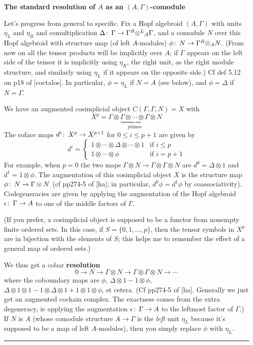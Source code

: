 \documentclass[12pt]{article}
\theoremstyle{definition}
\theoremstyle{remark}
\def\co{\colon\thinspace}
\newcommand{\rt}{{{}^R \otimes}}
\newcommand{\dt}{{{}^R \otimes^L}}
\begin{document}
\textbf{The standard resolution of $A$ as an $(A,\Gamma)$-comodule}

Let's progress from general to specific.  Fix a Hopf algebroid
$(A,\Gamma)$ with units $\eta_L$ and $\eta_R$ and comultiplication
$\Delta\co \Gamma \to \Gamma \dt_A \Gamma$, and a comodule $N$ over this
Hopf algebroid with structure map (of left $A$-modules) $\phi\co N \to \Gamma \rt_A N$.
(From now on all the tensor products will be implicitly over $A$; if
$\Gamma$ appears on the left side of the tensor it is implicitly using
$\eta_R$, the right unit, as the right module structure, and similarly
using $\eta_L$ if it appears on the opposite side.) Cf def 5.12 on p18 of [coctalos]. In particular, $\phi = \eta_L$ if $N = A$ (see below), and $\phi = \Delta$ if $N = \Gamma$.

We have an augmented cosimplicial object $C(\Gamma,\Gamma,N) = X$ with
\[
X^p = \Gamma \otimes \underbrace{\Gamma \otimes \cdots \otimes \Gamma}_{p\text{
    times}} \otimes N
\]
The coface maps $d^i\co X^p \to X^{p+1}$ for $0 \leq i \leq p+1$ are
given by
\[
d^i = \begin{cases}
1 \otimes \cdots \otimes \Delta \otimes \cdots
\otimes 1 &\text{if }i \leq p\\
1 \otimes \cdots \otimes \phi &\text{if }i = p+1
\end{cases}
\]
For example, when $p=0$ the two maps $\Gamma \otimes N \to \Gamma
\otimes \Gamma \otimes N$ are $d^0 = \Delta \otimes 1$ and $d^1 = 1
\otimes \phi$.  The augmentation of this cosimplicial object $X$ is the
structure map $\phi\co N \to \Gamma \otimes N$ (cf pp274-5 of [ha]; in particular, $d^0\phi = d^1\phi$ by coassociativity).  Codegeneracies are given by applying the augmentation of the Hopf algebroid $\epsilon\co \Gamma \to A$ to one of the middle factors of $\Gamma$.

(If you prefer, a cosimplicial object is supposed to be a functor from
nonempty finite ordered sets.  In this case, if $S = \{0,1,\ldots,p\}$,
then the tensor symbols in $X^p$ are in bijection with the elements of
$S$; this helps me to remember the effect of a general map of ordered
sets.)

We thus get a cobar \textbf{resolution}
\[
0 \to N \to \Gamma \otimes N \to \Gamma \otimes \Gamma \otimes N \to
\cdots
\]
where the coboundary maps are $\phi$, $\Delta \otimes 1 - 1 \otimes
\phi$, $\Delta \otimes 1 \otimes 1 - 1 \otimes \Delta \otimes 1 + 1
\otimes 1 \otimes \phi$, et cetera. (Cf pp274-5 of [ha]. Generally we just get an augmented cochain complex. The exactness comes from the extra degeneracy, ie applying the augmentation $\epsilon\co \Gamma \to A$ to the leftmost factor of $\Gamma$.) If $N$ is $A$ (whose comodule
structure $A \to \Gamma$ is the {\em   left} unit $\eta_L$ because
it's supposed to be a map of left $A$-modules), then you simply
replace $\phi$ with $\eta_L$.
\\
\hrule
\end{document}
